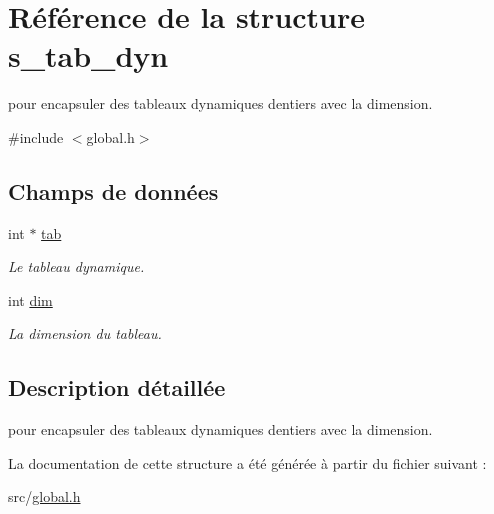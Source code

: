 \hypertarget{structs__tab__dyn}{}\section{Référence de la structure s\+\_\+tab\+\_\+dyn}
\label{structs__tab__dyn}


pour encapsuler des tableaux dynamiques d\textquotesingle{}entiers avec la dimension.  




{\ttfamily \#include $<$global.\+h$>$}

\subsection*{Champs de données}
\begin{DoxyCompactItemize}
\item 
\mbox{\label{structs__tab__dyn_a97599dc347ae84a1df38cab06b50dfa0}} 
int $\ast$ \mbox{\hyperlink{structs__tab__dyn_a97599dc347ae84a1df38cab06b50dfa0}{tab}}
\begin{DoxyCompactList}\small\item\em Le tableau dynamique. \end{DoxyCompactList}\item 
\mbox{\label{structs__tab__dyn_a70b5e28b5bc3d1b63a7435c5fe50b837}} 
int \mbox{\hyperlink{structs__tab__dyn_a70b5e28b5bc3d1b63a7435c5fe50b837}{dim}}
\begin{DoxyCompactList}\small\item\em La dimension du tableau. \end{DoxyCompactList}\end{DoxyCompactItemize}


\subsection{Description détaillée}
pour encapsuler des tableaux dynamiques d\textquotesingle{}entiers avec la dimension. 

La documentation de cette structure a été générée à partir du fichier suivant \+:\begin{DoxyCompactItemize}
\item 
src/\mbox{\hyperlink{global_8h}{global.\+h}}\end{DoxyCompactItemize}
